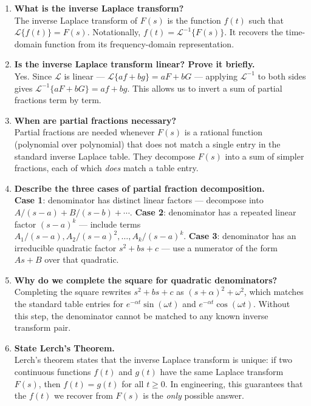 \documentclass[12pt,a4paper]{article}
\begin{document}
\begin{enumerate}[leftmargin=*, label=\textbf{Q\arabic*.}]

\item \textbf{What is the inverse Laplace transform?}\\
    The inverse Laplace transform of $F(s)$ is the function $f(t)$ such that
    $\mathcal{L}\{f(t)\} = F(s)$.  Notationally,
    $f(t) = \mathcal{L}^{-1}\{F(s)\}$.  It recovers the time-domain function
    from its frequency-domain representation.

\item \textbf{Is the inverse Laplace transform linear?  Prove it briefly.}\\
    Yes.  Since $\mathcal{L}$ is linear --- $\mathcal{L}\{af+bg\} = aF+bG$ ---
    applying $\mathcal{L}^{-1}$ to both sides gives
    $\mathcal{L}^{-1}\{aF+bG\} = af+bg$.  This allows us to invert a sum of
    partial fractions term by term.

\item \textbf{When are partial fractions necessary?}\\
    Partial fractions are needed whenever $F(s)$ is a rational function
    (polynomial over polynomial) that does not match a single entry in the
    standard inverse Laplace table.  They decompose $F(s)$ into a sum of
    simpler fractions, each of which \emph{does} match a table entry.

\item \textbf{Describe the three cases of partial fraction decomposition.}\\
    \textbf{Case 1}: denominator has distinct linear factors --- decompose into
    $A/(s-a) + B/(s-b) + \cdots$.
    \textbf{Case 2}: denominator has a repeated linear factor $(s-a)^{k}$ ---
    include terms $A_1/(s-a), A_2/(s-a)^2, \ldots, A_k/(s-a)^k$.
    \textbf{Case 3}: denominator has an irreducible quadratic factor
    $s^2+bs+c$ --- use a numerator of the form $As+B$ over that quadratic.

\item \textbf{Why do we complete the square for quadratic denominators?}\\
    Completing the square rewrites $s^2+bs+c$ as $(s+\alpha)^2+\omega^2$,
    which matches the standard table entries for $e^{-\alpha t}\sin(\omega t)$
    and $e^{-\alpha t}\cos(\omega t)$.  Without this step, the denominator
    cannot be matched to any known inverse transform pair.

\item \textbf{State Lerch's Theorem.}\\
    Lerch's theorem states that the inverse Laplace transform is unique: if two
    continuous functions $f(t)$ and $g(t)$ have the same Laplace transform
    $F(s)$, then $f(t) = g(t)$ for all $t \geq 0$.  In engineering, this
    guarantees that the $f(t)$ we recover from $F(s)$ is the \emph{only}
    possible answer.


\end{enumerate}
\end{document}
